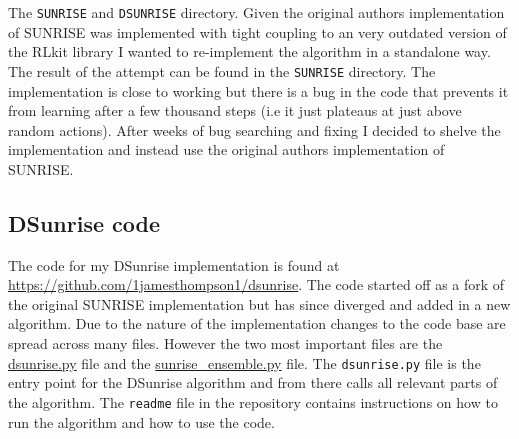 The \texttt{SUNRISE} and \texttt{DSUNRISE} directory. Given the original authors implementation of SUNRISE was implemented with tight coupling to an very outdated version of the RLkit library I wanted to re-implement the algorithm in a standalone way. The result of the attempt can be found in the \texttt{SUNRISE} directory. The implementation is close to working but there is a bug in the code that prevents it from learning after a few thousand steps (i.e it just plateaus at just above random actions). After weeks of bug searching and fixing I decided to shelve the implementation and instead use the original authors implementation of SUNRISE.

\subsection{DSunrise code}
The code for my DSunrise implementation is found at \url{https://github.com/1jamesthompson1/dsunrise}. The code started off as a fork of the original SUNRISE implementation but has since diverged and added in a new algorithm. Due to the nature of the implementation changes to the code base are spread across many files. However the two most important files are the \href{https://github.com/1jamesthompson1/dsunrise/blob/9d3b6fd8cb65dabcea6cbca64bfc4e84f7c89b80/OpenAIGym_SAC/examples/dsunrise.py}{dsunrise.py} file and the \href{https://github.com/1jamesthompson1/dsunrise/blob/9d3b6fd8cb65dabcea6cbca64bfc4e84f7c89b80/OpenAIGym_SAC/examples/sunrise\_ensemble.py}{sunrise\_ensemble.py} file. The \texttt{dsunrise.py} file is the entry point for the DSunrise algorithm and from there calls all relevant parts of the algorithm. The \texttt{readme} file in the repository contains instructions on how to run the algorithm and how to use the code.